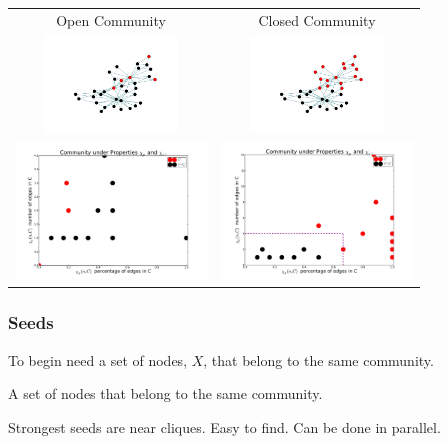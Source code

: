 \documentclass{beamer}
\begin{document}
\begin{frame}
\begin{table}
\centering
\begin{tabular}{cc}
Open Community & Closed Community \\
\includegraphics[width=1.4in]{Figures/open_community_drawn} &  \includegraphics[width=1.4in]{Figures/closed_community_drawn} \\
\includegraphics[width=2in]{Figures/open_community_e_p} &  \includegraphics[width=2in]{Figures/closed_community_e_p} 
\end{tabular}
\end{table}
\end{frame}


\begin{frame}\frametitle{Seeds}

To begin need a set of nodes, $X$, that belong to the same community. \newline \newline

\begin{definition}[Seed]
A set of nodes that belong to the same community. \newline
\end{definition}
Strongest seeds are near cliques.  Easy to find. Can be done in parallel.
\end{frame}
\end{document}
